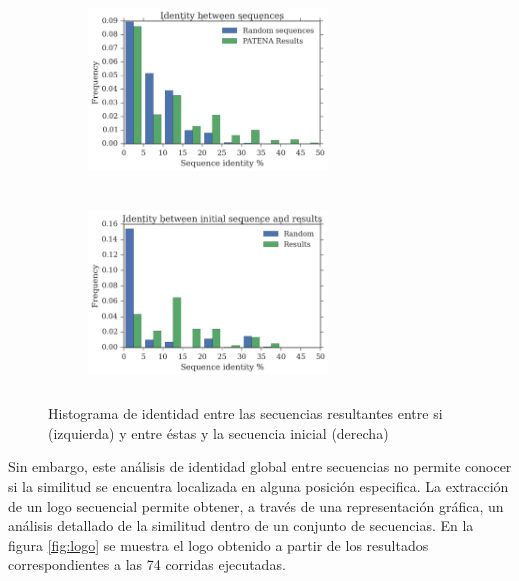 \begin{figure}[htbp]
  \begin{subfigure}[b]{200px}
    \includegraphics[width=240px,height=185px]{img/resultados/againstAll-random.png}
    \label{fig:identity-a}
    \end{subfigure}
  \hspace{30px}
  \begin{subfigure}[b]{200px}
  \includegraphics[width=240px,height=185px]{img/resultados/againstInitial-random.png}
    \label{fig:identity-b}
  \end{subfigure}
  \caption{Histograma de identidad entre las secuencias resultantes entre si (izquierda) y entre éstas y la secuencia inicial (derecha)}
  \label{fig:identity}
  
\end{figure}




Sin embargo, este análisis de identidad global entre secuencias no permite conocer si la similitud se encuentra localizada en alguna posición especifica.
La extracción de un logo secuencial \cite{schneider1990sequence} permite obtener, a través de una representación gráfica, un análisis detallado de la similitud dentro de un conjunto de secuencias.
En la figura \ref{fig:logo} se muestra el logo obtenido a partir de los resultados correspondientes a las 74 corridas ejecutadas.


